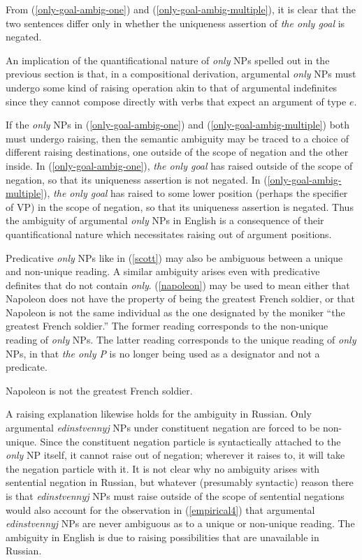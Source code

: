 From (\ref{only-goal-ambig-one}) and (\ref{only-goal-ambig-multiple}), it is clear that the two sentences differ only in whether the uniqueness assertion of \textit{the only goal} is negated.

An implication of the quantificational nature of \textit{only} NPs spelled out in the previous section is that, in a compositional derivation, argumental \textit{only} NPs must undergo some kind of raising operation akin to that of argumental indefinites since they cannot compose directly with verbs that expect an argument of type $e$.

If the \textit{only} NPs in (\ref{only-goal-ambig-one}) and (\ref{only-goal-ambig-multiple}) both must undergo raising, then the semantic ambiguity may be traced to a choice of different raising destinations, one outside of the scope of negation and the other inside. In (\ref{only-goal-ambig-one}), \textit{the only goal} has raised outside of the scope of negation, so that its uniqueness assertion is not negated. In (\ref{only-goal-ambig-multiple}), \textit{the only goal} has raised to some lower position (perhaps the specifier of VP) in the scope of negation, so that its uniqueness assertion is negated. Thus the ambiguity of argumental \textit{only} NPs in English is a consequence of their quantificational nature which necessitates raising out of argument positions.

Predicative \textit{only} NPs like in (\ref{scott}) may also be ambiguous between a unique and non-unique reading. A similar ambiguity arises even with predicative definites that do not contain \textit{only}. (\ref{napoleon}) may be used to mean either that Napoleon does not have the property of being the greatest French soldier, or that Napoleon is not the same individual as the one designated by the moniker ``the greatest French soldier.'' The former reading corresponds to the non-unique reading of \textit{only} NPs. The latter reading corresponds to the unique reading of \textit{only} NPs, in that \textit{the only P} is no longer being used as a designator and not a predicate.

\begin{exe}
	\ex \label{napoleon} Napoleon is not the greatest French soldier.
\end{exe}

A raising explanation likewise holds for the ambiguity in Russian. Only argumental \textit{edinstvennyj} NPs under constituent negation are forced to be non-unique. Since the constituent negation particle is syntactically attached to the \textit{only} NP itself, it cannot raise out of negation; wherever it raises to, it will take the negation particle with it. It is not clear why no ambiguity arises with sentential negation in Russian, but whatever (presumably syntactic) reason there is that \textit{edinstvennyj} NPs must raise outside of the scope of sentential negations would also account for the observation in (\ref{empirical4}) that argumental \textit{edinstvennyj} NPs are never ambiguous as to a unique or non-unique reading. The ambiguity in English is due to raising possibilities that are unavailable in Russian.

